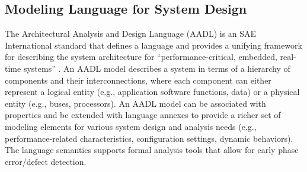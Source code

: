 \subsection{Modeling Language for System Design}
\label{subsec:aadl-agree}
The Architectural Analysis and Design Language (AADL)
\cite{FeilerModelBasedEngineering2012} is an SAE International standard \cite{AADL_Standard} that defines a language and provides a unifying framework for describing the system architecture for ``performance-critical, embedded, real-time systems'' \cite{AADL_Standard}. An AADL model describes a system in terms of a hierarchy of components and their interconnections, where each component can either represent a logical entity (e.g., application software functions, data) or a physical entity (e.g., buses, processors). An AADL model can be associated with properties and be extended with language annexes to provide a richer set of modeling elements for various system design and analysis needs (e.g., performance-related characteristics, configuration settings, dynamic behaviors). The language semantics supports formal analysis tools that allow for early phase error/defect detection.

